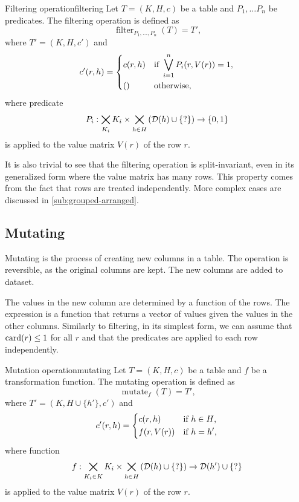 \begin{defbox}{Filtering operation}{filtering}
  Let $T = (K, H, c)$ be a table and $P_1, \dots P_n$ be predicates.  The
  filtering operation is defined as \[
    \operatorname{filter}_{P_1, \dots, P_n}(T) = T'\text{,}
  \] where $T' = (K, H, c')$ and \[
    c'(r, h) = \begin{dcases}
      c(r, h) & \text{if } \bigvee_{i = 1}^{n} P_i(r, V(r)) = 1\text{,} \\
      () & \text{otherwise}\text{,}
    \end{dcases}
  \] where predicate $$P_i : \bigtimes_{K_i} K_i \times
  \bigtimes_{h\in H}\left(\domainof{h} \cup \{?\}\right) \to \{0, 1\}$$ is applied to the value
  matrix $V(r)$ of the row $r$.
\end{defbox}

It is also trivial to see that the filtering operation is split-invariant, even in its
generalized form where the value matrix has many rows.  This property comes from the fact
that rows are treated independently.  More complex cases are discussed in
\cref{sub:grouped-arranged}.

\subsection{Mutating}

Mutating is the process of creating new columns in a table.  The operation is reversible,
as the original columns are kept.  The new columns are added to dataset.

The values in the new column are determined by a function of the rows.  The expression is
a function that returns a vector of values given the values in the other columns.
Similarly to filtering, in its simplest form, we can assume that $\rowcard[r] \leq 1$ for
all $r$ and that the predicates are applied to each row independently.

\begin{defbox}{Mutation operation}{mutating}
  Let $T = (K, H, c)$ be a table and $f$ be a transformation function.  The mutating
  operation is defined as \[
    \operatorname{mutate}_{f}(T) = T'\text{,}
  \] where $T' = (K, H \cup \{ h' \}, c')$ and \[
    c'(r, h) = \begin{dcases}
      c(r, h) & \text{if } h \in H\text{,} \\
      f(r, V(r)) & \text{if } h = h'\text{,}
    \end{dcases}
  \] where function $$f : \bigtimes_{K_i \in K} K_i \times \bigtimes_{h\in H}
  \left(\domainof{h} \cup \{?\}\right) \to \domainof{h'} \cup \{?\}$$ is applied to the
  value matrix $V(r)$ of the row $r$.
\end{defbox}

